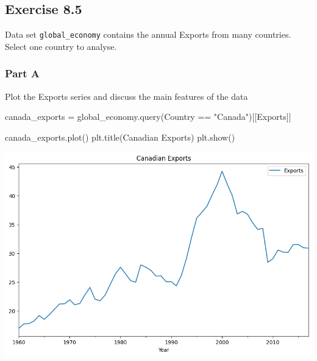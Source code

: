\documentclass[
  11pt,
]{article}
\newenvironment{Shaded}{\begin{snugshade}}{\end{snugshade}}
\newcommand{\NormalTok}[1]{\textcolor[rgb]{0.00,0.23,0.31}{#1}}
\newcommand{\OperatorTok}[1]{\textcolor[rgb]{0.37,0.37,0.37}{#1}}
\newcommand{\StringTok}[1]{\textcolor[rgb]{0.13,0.47,0.30}{#1}}
\begin{document}
\subsection{Exercise 8.5}\label{exercise-8.5}

Data set \texttt{global\_economy} contains the annual Exports from many
countries. Select one country to analyse.

\subsubsection{Part A}\label{part-a-1}

Plot the Exports series and discuss the main features of the data

\begin{Shaded}
\begin{Highlighting}[]
\NormalTok{canada\_exports }\OperatorTok{=}\NormalTok{ global\_economy.query(}\StringTok{\textquotesingle{}Country == "Canada"\textquotesingle{}}\NormalTok{)[[}\StringTok{\textquotesingle{}Exports\textquotesingle{}}\NormalTok{]]}
\end{Highlighting}
\end{Shaded}

\begin{Shaded}
\begin{Highlighting}[]
\NormalTok{canada\_exports.plot()}
\NormalTok{plt.title(}\StringTok{\textquotesingle{}Canadian Exports\textquotesingle{}}\NormalTok{)}
\NormalTok{plt.show()}
\end{Highlighting}
\end{Shaded}

\includegraphics{hw5_files/figure-pdf/cell-13-output-1.png}
\end{document}
